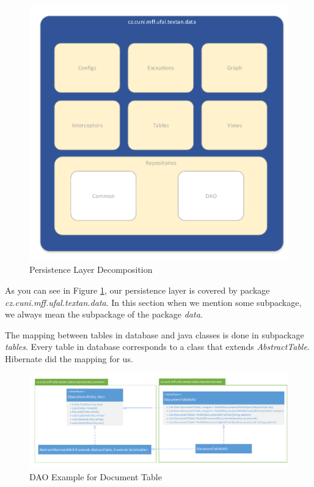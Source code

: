 \begin{figure}[!htb]
        \centering
        \includegraphics[width=\textwidth]{Images/DataDecomposition}
        \caption{Persistence Layer Decomposition}
        \label{fig:DataDecomposition}
\end{figure}

As you can see in Figure \ref{fig:DataDecomposition}, our persistence layer is
covered by package \emph{cz.cuni.mff.ufal.textan.data}. In this section when we
mention some subpackage, we always mean the subpackage of the package \emph{data}.

The mapping between tables in database and java classes is done in subpackage
\emph{tables}. Every table in database corresponds to a class that extends
\emph{AbstractTable}. Hibernate did the mapping for us. 

\begin{figure}[!htb]
        \centering
        \includegraphics[width=\textwidth]{Images/DatabaseDAO}
        \caption{DAO Example for Document Table}
        \label{fig:DatabaseDAO}
\end{figure}

